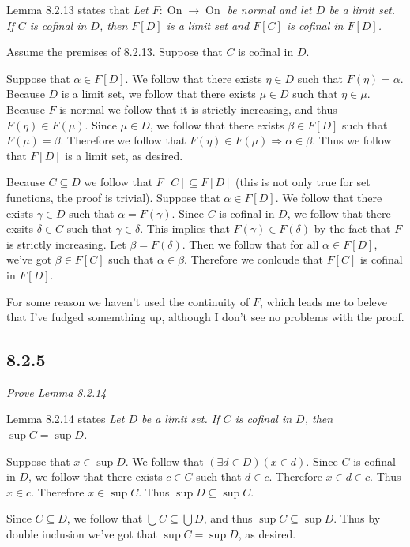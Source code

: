 \documentclass[11pt,oneside,titlepage]{book}
\DeclareMathOperator \ra {\Rightarrow}
\DeclareMathOperator \On {On}
\begin{document}
Lemma 8.2.13 states that
\textit{Let $F: \On \to \On$ be normal and let $D$ be a limit set. If $C$ is
  cofinal in $D$, then $F[D]$ is a limit set and $F[C]$ is cofinal in $F[D]$.}

Assume the premises of 8.2.13. Suppose that $C$ is cofinal in $D$.

Suppose that $\alpha \in F[D]$. We follow that there exists $\eta \in D$ such that
$F(\eta) = \alpha$. Because $D$ is a limit set, we follow that there exists $\mu \in D$
such that $\eta \in \mu$. Because $F$ is normal we follow that it is strictly increasing,
and thus $F(\eta) \in F(\mu)$. Since $\mu \in D$, we follow that there exists $\beta \in F[D]$
such that $F(\mu) = \beta$. Therefore we follow that $F(\eta) \in F(\mu) \ra \alpha \in \beta$.
Thus we follow that $F[D]$ is a limit set, as desired.

Because $C \subseteq D$ we follow that $F[C] \subseteq F[D]$ (this is not only true
for set functions, the proof is trivial). Suppose that $\alpha \in F[D]$.
We follow that there exists $\gamma \in D$ such that $\alpha = F(\gamma)$. Since
$C$ is cofinal in $D$, we follow that there exsits $\delta \in C$ such that
$\gamma \in \delta$. This implies that $F(\gamma) \in F(\delta)$ by the fact that
$F$ is strictly increasing. Let $\beta = F(\delta)$. Then we follow that
for all $\alpha \in F[D]$, we've got $\beta \in F[C]$ such that $\alpha \in \beta$.
Therefore we conlcude that $F[C]$ is cofinal in $F[D]$.

For some reason we haven't used the continuity of $F$, which leads me to beleve that
I've fudged somemthing up, although I don't see no problems with the proof.

\subsection*{8.2.5}

\textit{Prove Lemma 8.2.14}

Lemma 8.2.14 states
\textit{Let $D$ be a limit set. If $C$ is cofinal in $D$, then $\sup C = \sup D$.}

Suppose that $x \in \sup{D}$. We follow that $(\exists d \in D)(x \in d)$.
Since $C$ is cofinal in $D$, we follow that there exists $c \in C$ such that
$d \in c$. Therefore $x \in d \in c$. Thus $x \in c$. Therefore
$x \in \sup C$. Thus $\sup {D} \subseteq \sup{C}$. 

Since $C \subseteq D$, we follow that $\bigcup{C} \subseteq \bigcup{D}$, and thus
$\sup C \subseteq \sup D$. Thus by double inclusion we've got that $\sup C = \sup D$,
as desired.
\end{document}
